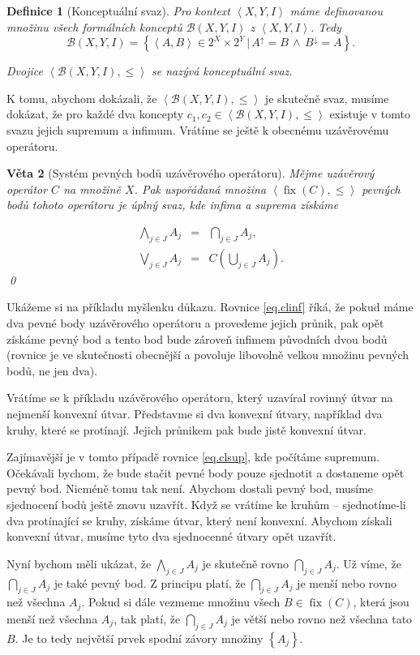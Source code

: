 \documentclass[12pt]{article}
\newcommand{\sep}{\,|\,}
\newcommand{\adds}[1]{\left\{#1\right\}}
\newcommand{\addsp}[1]{\left<#1\right>}
\newcommand{\logand}{\,\wedge\,}
\DeclareMathOperator{\fix}{fix}
\newcommand{\context}{\addsp{X, Y, I}}
\newcommand{\lattice}{\mathcal{B}(X, Y, I)}
\newcommand{\up}{^{\uparrow}}
\newcommand{\down}{^{\downarrow}}
\newcommand{\biginf}{\bigwedge}
\newcommand{\bigsup}{\bigvee}
\newtheorem{mydef}{Definice}
\newtheorem{theorem}[mydef]{Věta}
\begin{document}
\begin{mydef}[Konceptuální svaz]
Pro kontext $\context$ máme definovanou množinu všech formálních konceptů $\lattice$ z $\context$. Tedy
$$\lattice=\adds{\addsp{A, B}\in 2^X\times 2^Y\sep A\up=B\logand B\down=A}.$$

Dvojice $\addsp{\lattice, \le}$ se nazývá konceptuální svaz. 
\end{mydef}

K tomu, abychom dokázali, že $\addsp{\lattice, \le}$ je skutečně svaz, musíme dokázat, že pro každé dva koncepty $c_1, c_2\in\addsp{\lattice, \le}$ existuje v tomto svazu jejich supremum a infimum. Vrátíme se ještě k obecnému uzávěrovému operátoru. 

\begin{theorem}[Systém pevných bodů uzávěrového operátoru]\label{th.sysfix}
Mějme uzávěrový operátor $C$ na množině $X$. Pak uspořádaná množina $\addsp{\fix(C), \le}$ pevných bodů tohoto operátoru je úplný svaz, kde infima a suprema získáme

\begin{eqnarray}
\biginf_{j\in J}A_j&=&\bigcap_{j\in J}A_j,\label{eq.clinf}\\
\bigsup_{j\in J}A_j&=&C(\bigcup_{j\in J}A_j).\label{eq.clsup}
\end{eqnarray}
\qed\end{theorem}

Ukážeme si na příkladu myšlenku důkazu. Rovnice \ref{eq.clinf} říká, že pokud máme dva pevné body uzávěrového operátoru a provedeme jejich průnik, pak opět získáme pevný bod a tento bod bude zároveň infimem původních dvou bodů (rovnice je ve skutečnosti obecnější a povoluje libovolně velkou množinu pevných bodů, ne jen dva).

Vrátíme se k příkladu uzávěrového operátoru, který uzavíral rovinný útvar na nejmenší konvexní útvar. Představme si dva konvexní útvary, například dva kruhy, které se protínají. Jejich průnikem pak bude jistě konvexní útvar. 

Zajímavější je v tomto případě rovnice \ref{eq.clsup}, kde počítáme supremum. Očekávali bychom, že bude stačit pevné body pouze sjednotit a dostaneme opět pevný bod. Nicméně tomu tak není. Abychom dostali pevný bod, musíme sjednocení bodů ještě znovu uzavřít. Když se vrátíme ke kruhům -- sjednotíme-li dva protínající se kruhy, získáme útvar, který není konvexní. Abychom získali konvexní útvar, musíme tyto dva sjednocenné útvary opět uzavřít. 

Nyní bychom měli ukázat, že $\biginf_{j\in J}A_j$ je skutečně rovno $\bigcap_{j\in J}A_j$. Už víme, že $\bigcap_{j\in J}A_j$ je také pevný bod. Z principu platí, že $\bigcap_{j\in J}A_j$ je menší nebo rovno než všechna $A_j$. Pokud si dále vezmeme množinu všech $B\in\fix(C)$, která jsou menší než všechna $A_j$, tak platí, že $\bigcap_{j\in J}A_j$ je větší nebo rovno než všechna tato $B$. Je to tedy největší prvek spodní závory množiny $\adds{A_j}$. 
\end{document}
